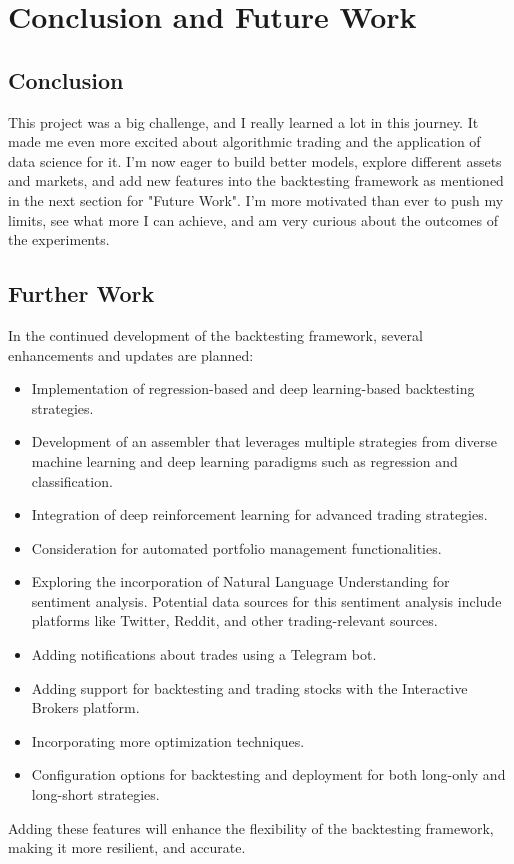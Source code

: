 \chapter{Conclusion and Future Work}

\section{Conclusion}
This project was a big challenge, and I really learned a lot in this journey.
It made me even more excited about algorithmic trading and the application of data science for it.
I'm now eager to build better models, explore different assets and markets, and add new features into the backtesting framework as mentioned in the next section for "Future Work".
I'm more motivated than ever to push my limits, see what more I can achieve, and am very curious about the outcomes of the experiments.

\section{Further Work}
In the continued development of the backtesting framework, several enhancements and updates are planned:

\begin{itemize}
    \item Implementation of regression-based and deep learning-based backtesting strategies.
    \item Development of an assembler that leverages multiple strategies from diverse machine learning and deep learning paradigms such as regression and classification.
    \item Integration of deep reinforcement learning for advanced trading strategies.
    \item Consideration for automated portfolio management functionalities.
    \item Exploring the incorporation of Natural Language Understanding for sentiment analysis.
Potential data sources for this sentiment analysis include platforms like Twitter, Reddit, and other trading-relevant sources.
    \item Adding notifications about trades using a Telegram bot.
    \item Adding support for backtesting and trading stocks with the Interactive Brokers platform.
    \item Incorporating more optimization techniques.
    \item Configuration options for backtesting and deployment for both long-only and long-short strategies.
\end{itemize}

Adding these features will enhance the flexibility of the backtesting framework, making it more resilient, and accurate.
